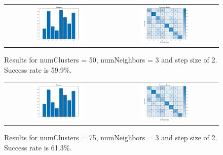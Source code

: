 \begin{figure}[h]
	\centering
	\begin{tabular}{cc}	
	\includegraphics[width=0.5\textwidth]{figures/precision_50C_3NN_2S.png} &
	\includegraphics[width=0.5\textwidth]{figures/confusion_50C_3NN_2S.png}

	\end{tabular}
	\caption{Results for numClusters = 50, numNeighbors = 3 and step size of 2. Success rate is 59.9\%.}
	\label{fig:a5:50c3nn2s}
\end{figure}

\begin{figure}[h]
	\centering
	\begin{tabular}{cc}	
	\includegraphics[width=0.5\textwidth]{figures/precision_75C_3NN_2S.png} &
	\includegraphics[width=0.5\textwidth]{figures/confusion_75C_3NN_2S.png}

	\end{tabular}
	\caption{Results for numClusters = 75, numNeighbors = 3 and step size of 2. Success rate is 61.3\%.}
	\label{fig:a5:75c3nn2s}
\end{figure}

